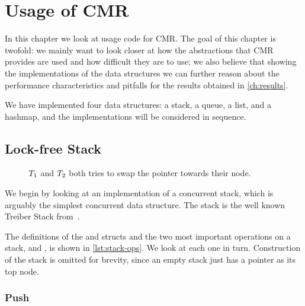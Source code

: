 \chapter{Usage of CMR\label{ch:usage}}

In this chapter we look at usage code for CMR\@. The goal of this chapter is twofold: we mainly
want to look closer at how the abstractions that CMR provides are used and how difficult they are
to use; we also believe that showing the implementations of the data structures we can further
reason about the performance characteristics and pitfalls for the results obtained in
\cref{ch:results}.

We have implemented four data structures: a stack, a queue, a list, and a hashmap, and the
implementations will be considered in sequence.


\clearpage


\section{Lock-free Stack\label{sec:usage-stack}}

\begin{figure}[b]
\centering

\caption{$T\sb{1}$ and $T\sb{2}$ both tries to swap the  pointer towards their
node.}
\end{figure}

We begin by looking at an implementation of a concurrent stack, which is arguably the simplest
concurrent data structure. The stack is the well known Treiber Stack
from~\cite{treiber1986systems}.

The definitions of the  and  structs and the two most important operations
on a stack,  and , is shown in \cref{lst:stack-ops}. We look at each one in
turn. Construction of the stack is omitted for brevity, since an empty stack just has a 
pointer as its top node.

\begin{figure}[ht]

\end{figure}

\subsection{Push}

